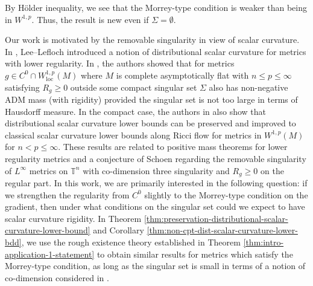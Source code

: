 \documentclass[12pt]{amsart}
\theoremstyle{plain}
\theoremstyle{plain}
\theoremstyle{definition}
\theoremstyle{remark}
\numberwithin{equation}{subsection}
\begin{document}
By H\"older inequality, we see that the Morrey-type condition is weaker than being in $W^{1,p}$. Thus, the result is new even if $\Sigma=\emptyset$.







Our work is motivated by the removable singularity in view of scalar curvature. In \cite{lee_positive_2015}, Lee--Lefloch introduced a notion of distributional scalar curvature for metrics with lower regularity. In \cite{jiang_removable_2022}, the authors showed that for metrics $g \in C^0 \cap W^{1,p}_{\text{loc}}(M)$ where $M$ is complete asymptotically flat with $n \leq p \leq \infty$ satisfying $R_g \geq 0$ outside some compact singular set $\Sigma$ also has non-negative ADM mass (with rigidity) provided the singular set is not too large in terms of Hausdorff measure. In the compact case,  the authors in \cite{jiang_weak_2021} also show that distributional scalar curvature lower bounds can be preserved and improved to classical scalar curvature lower bounds along Ricci flow for metrics in $W^{1,p}(M)$ for $n < p \leq \infty$. These results are related to positive mass theorems for lower regularity metrics and a conjecture of Schoen regarding the removable singularity of $L^\infty$ metrics on $\mathbb{T}^n$ with co-dimension three singularity and $R_g \geq 0$ on the regular part. In this work, we are primarily interested in the following question: if we strengthen the regularity from $C^0$ slightly to the Morrey-type condition on the gradient, then under what conditions on the singular set could we expect to have scalar curvature rigidity. In Theorem \ref{thm:preservation-distributional-scalar-curvature-lower-bound} and Corollary \ref{thm:non-cpt-dist-scalar-curvature-lower-bdd}, we use the rough existence theory established in Theorem \ref{thm:intro-application-1-statement} to obtain similar results for metrics which satisfy the Morrey-type condition, as long as the singular set is small in terms of a notion of co-dimension considered in \cite{lee_continuous_2021}.
\end{document}
